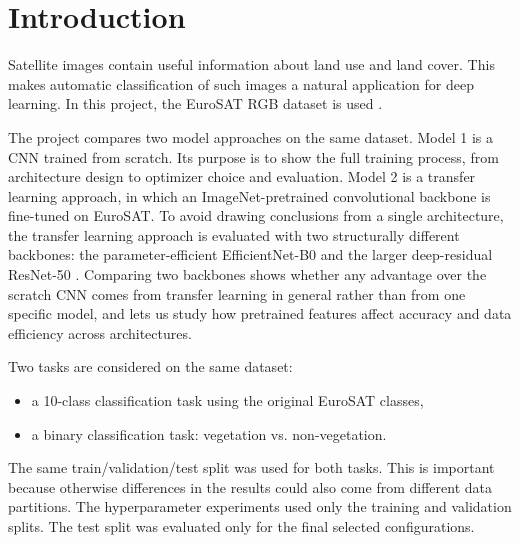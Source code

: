 \section{Introduction}

Satellite images contain useful information about land use and land cover. This
makes automatic classification of such images a natural application for deep
learning. In this project, the EuroSAT RGB dataset is used
\cite{helber2019eurosat,eurosatgithub}.

The project compares two model approaches on the same dataset. Model 1 is a CNN
trained from scratch. Its purpose is to show the full training process, from
architecture design to optimizer choice and evaluation. Model 2 is a transfer
learning approach, in which an ImageNet-pretrained convolutional backbone is
fine-tuned on EuroSAT. To avoid drawing conclusions from a single architecture,
the transfer learning approach is evaluated with two structurally different
backbones: the parameter-efficient EfficientNet-B0
\cite{tan2019efficientnet,pytorch} and the larger deep-residual ResNet-50
\cite{he2016resnet}. Comparing two backbones shows whether any advantage over
the scratch CNN comes from transfer learning in general rather than from one
specific model, and lets us study how pretrained features affect accuracy and
data efficiency across architectures.

Two tasks are considered on the same dataset:

\begin{itemize}
  \item a 10-class classification task using the original EuroSAT classes,
  \item a binary classification task: vegetation vs. non-vegetation.
\end{itemize}

The same train/validation/test split was used for both tasks. This is important
because otherwise differences in the results could also come from different
data partitions. The hyperparameter experiments used only the training and
validation splits. The test split was evaluated only for the final selected
configurations.
